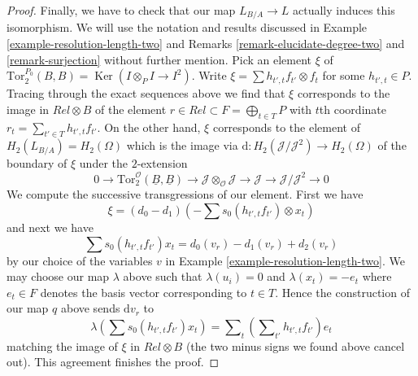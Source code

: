 \documentclass{stacks-project}
\theoremstyle{plain}
\theoremstyle{definition}
\theoremstyle{remark}
\numberwithin{equation}{subsection}
\def\Ker{\mathop{\mathrm{Ker}}}
\begin{document}
\begin{proof}
\medskip\noindent
Finally, we have to check that our map $L_{B/A} \to L$ actually induces
this isomorphism. We will use the notation and results discussed in
Example \ref{example-resolution-length-two} and
Remarks \ref{remark-elucidate-degree-two} and \ref{remark-surjection}
without further mention. Pick an element $\xi$ of
$\text{Tor}_2^{P_0}(B, B) = \Ker(I \otimes_P I \to I^2)$.
Write $\xi = \sum h_{t', t}f_{t'} \otimes f_t$ for some
$h_{t', t} \in P$. Tracing through the exact sequences above we
find that $\xi$ corresponds to the image in $Rel \otimes B$
of the element $r \in Rel \subset F = \bigoplus_{t \in T} P$ with
$t$th coordinate $r_t = \sum_{t' \in T} h_{t', t}f_{t'}$.
On the other hand, $\xi$ corresponds to the element of
$H_2(L_{B/A}) = H_2(\Omega)$ which is the image
via $\text{d} : H_2(\mathcal{J}/\mathcal{J}^2) \to H_2(\Omega)$
of the boundary of $\xi$ under the $2$-extension
$$
0 \to
\text{Tor}_2^\mathcal{O}(\underline{B}, \underline{B})
\to 
\mathcal{J} \otimes_\mathcal{O} \mathcal{J} \to \mathcal{J}
\to
\mathcal{J}/\mathcal{J}^2 \to 0
$$
We compute the successive transgressions of our element. First we have
$$
\xi = (d_0 - d_1)(- \sum s_0(h_{t', t} f_{t'}) \otimes x_t)
$$
and next we have
$$
\sum s_0(h_{t', t} f_{t'}) x_t = d_0(v_r) - d_1(v_r) + d_2(v_r)
$$
by our choice of the variables $v$ in
Example \ref{example-resolution-length-two}.
We may choose our map $\lambda$ above such that
$\lambda(u_i) = 0$ and $\lambda(x_t) = - e_t$ where $e_t \in F$
denotes the basis vector corresponding to $t \in T$.
Hence the construction of our map $q$ above sends $\text{d}v_r$ to
$$
\lambda(\sum s_0(h_{t', t} f_{t'}) x_t) =
\sum\nolimits_t \left(\sum\nolimits_{t'} h_{t', t}f_{t'}\right) e_t
$$
matching the image of $\xi$ in $Rel \otimes B$ (the two minus signs
we found above cancel out). This agreement finishes the proof.
\end{proof}
\end{document}
